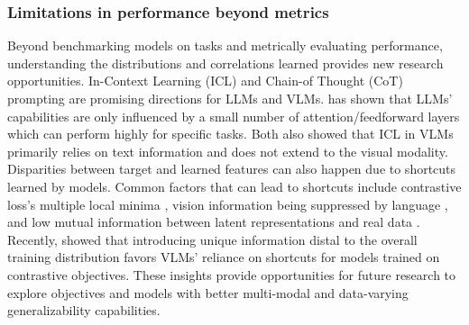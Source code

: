 


\subsubsection{Limitations in performance beyond metrics}

Beyond benchmarking models on tasks and metrically evaluating performance, understanding the distributions and correlations learned provides new research opportunities. In-Context Learning (ICL) \citep{brown2020language,hoffmann2022empirical} and Chain-of Thought (CoT) \citep{wei2022chain} prompting are promising directions for LLMs and VLMs. \citet{bansal2023rethinking} has shown that LLMs' capabilities are only influenced by a small number of attention/feedforward layers which can perform highly for specific tasks. Both \citet{baldassini2024makes,chen2024understanding} also showed that ICL in VLMs primarily relies on text information and does not extend to the visual modality. Disparities between target and learned features can also happen due to shortcuts learned by models. Common factors that can lead to shortcuts include contrastive loss's multiple local minima \citep{robinson2021can}, vision information being suppressed by language \citep{li2023addressing}, and low mutual information between latent representations and real data \citep{adnan2022monitoring}. Recently, \citet{bleeker2024demonstrating} showed that introducing unique information distal to the overall training distribution favors VLMs' reliance on shortcuts for models trained on contrastive objectives. These insights provide opportunities for future research to explore objectives and models with better multi-modal and data-varying generalizability capabilities.



